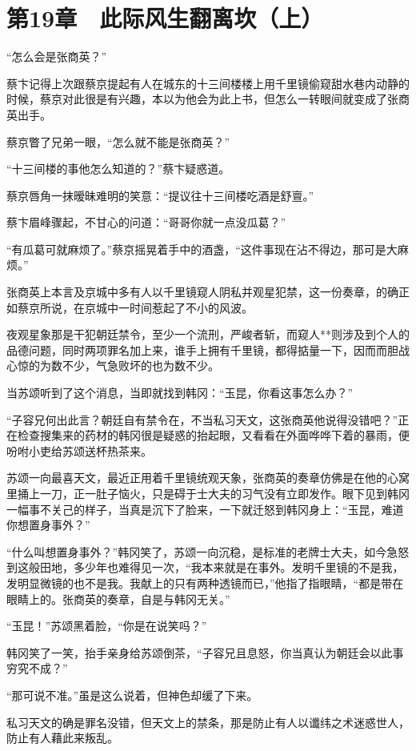 \section{第19章　此际风生翻离坎（上）}

“怎么会是张商英？”

蔡卞记得上次跟蔡京提起有人在城东的十三间楼楼上用千里镜偷窥甜水巷内动静的时候，蔡京对此很是有兴趣，本以为他会为此上书，但怎么一转眼间就变成了张商英出手。

蔡京瞥了兄弟一眼，“怎么就不能是张商英？”

“十三间楼的事他怎么知道的？”蔡卞疑惑道。

蔡京唇角一抹暧昧难明的笑意：“提议往十三间楼吃酒是舒亶。”

蔡卞眉峰骤起，不甘心的问道：“哥哥你就一点没瓜葛？”

“有瓜葛可就麻烦了。”蔡京摇晃着手中的酒盏，“这件事现在沾不得边，那可是大麻烦。”

张商英上本言及京城中多有人以千里镜窥人阴私并观星犯禁，这一份奏章，的确正如蔡京所说，在京城中一时间惹起了不小的风波。

夜观星象那是干犯朝廷禁令，至少一个流刑，严峻者斩，而窥人**则涉及到个人的品德问题，同时两项罪名加上来，谁手上拥有千里镜，都得掂量一下，因而而胆战心惊的为数不少，气急败坏的也为数不少。

当苏颂听到了这个消息，当即就找到韩冈：“玉昆，你看这事怎么办？”

“子容兄何出此言？朝廷自有禁令在，不当私习天文，这张商英他说得没错吧？”正在检查搜集来的药材的韩冈很是疑惑的抬起眼，又看看在外面哗哗下着的暴雨，便吩咐小吏给苏颂送杯热茶来。

苏颂一向最喜天文，最近正用着千里镜统观天象，张商英的奏章仿佛是在他的心窝里捅上一刀，正一肚子恼火，只是碍于士大夫的习气没有立即发作。眼下见到韩冈一幅事不关己的样子，当真是沉下了脸来，一下就迁怒到韩冈身上：“玉昆，难道你想置身事外？”

“什么叫想置身事外？”韩冈笑了，苏颂一向沉稳，是标准的老牌士大夫，如今急怒到这般田地，多少年也难得见一次，“我本来就是在事外。发明千里镜的不是我，发明显微镜的也不是我。我献上的只有两种透镜而已，”他指了指眼睛，“都是带在眼睛上的。张商英的奏章，自是与韩冈无关。”

“玉昆！”苏颂黑着脸，“你是在说笑吗？”

韩冈笑了一笑，抬手亲身给苏颂倒茶，“子容兄且息怒，你当真认为朝廷会以此事穷究不成？”

“那可说不准。”虽是这么说着，但神色却缓了下来。

私习天文的确是罪名没错，但天文上的禁条，那是防止有人以谶纬之术迷惑世人，防止有人藉此来叛乱。


